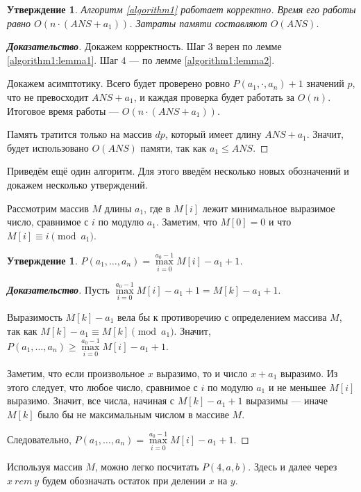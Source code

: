 \documentclass[12pt]{article}
\newtheorem{proposition}[theorem]{Утверждение}
\begin{document}
\begin{proposition}
Алгоритм \ref{algorithm1} работает корректно. Время его работы равно $O(n \cdot (ANS + a_1))$. Затраты памяти составляют $O(ANS)$.
\end{proposition}
\begin{proof}[\textbf{Доказательство}]
Докажем корректность. Шаг 3 верен по лемме \ref{algorithm1:lemma1}. Шаг 4 --- по лемме \ref{algorithm1:lemma2}.

Докажем асимптотику. Всего будет проверено ровно $P(a_1, \cdot, a_n) + 1$ значений $p$, что не превосходит $ANS + a_1$, и каждая проверка будет работать за $O(n)$. Итоговое время работы --- $O(n \cdot (ANS + a_1))$.

Память тратится только на массив $dp$, который имеет длину $ANS + a_1$. Значит, будет использовано $O(ANS)$ памяти, так как $a_1 \le ANS$.
\end{proof}

Приведём ещё один алгоритм. Для этого введём несколько новых обозначений и докажем несколько утверждений.

Рассмотрим массив $M$ длины $a_1$, где в $M[i]$ лежит минимальное выразимое число, сравнимое с $i$ по модулю $a_1$. Заметим, что $M[0] = 0$ и что $M[i] \equiv i \pmod {a_1}$.

\begin{proposition}
\label{algorithm2:lemma1}
$P(a_1, \dots, a_n) = \max\limits_{i = 0}^{a_0 - 1} M[i] - a_1 + 1$.
\end{proposition}
\begin{proof}[\textbf{Доказательство}]
Пусть $\max\limits_{i = 0}^{a_0 - 1} M[i] - a_1 + 1 = M[k] - a_1 + 1$.

Выразимость $M[k] - a_1$ вела бы к противоречию с определением массива $M$, так как $M[k] - a_1 \equiv M[k] \pmod {a_1}$. Значит, $P(a_1, \dots, a_n) \ge \max\limits_{i = 0}^{a_0 - 1} M[i] - a_1 + 1$.

Заметим, что если произвольное $x$ выразимо, то и число $x + a_1$ выразимо. Из этого следует, что любое число, сравнимое с $i$ по модулю $a_1$ и не меньшее $M[i]$ выразимо. Значит, все числа, начиная с $M[k] - a_1 + 1$ выразимы --- иначе $M[k]$ было бы не максимальным числом в массиве $M$.

Следовательно, $P(a_1, \dots, a_n) = \max\limits_{i = 0}^{a_0 - 1} M[i] - a_1 + 1$.
\end{proof}

Используя массив $M$, можно легко посчитать $P(4, a, b)$. Здесь и далее через $x \ rem \ y$ будем обозначать  остаток при делении $x$ на $y$.
\end{document}
